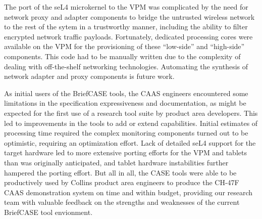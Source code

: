 
The port of the seL4 microkernel to the VPM was complicated by the need for network
proxy and adapter components to bridge the untrusted wireless network to the rest of the sytem in a trustworthy
manner, including the ability to filter encrypted network traffic payloads. Fortunately, dedicated
processing cores were available on the VPM for the provisioning of these ``low-side'' and ``high-side''
components. This code had to be manually written due to the complexity of dealing with
off-the-shelf networking technologies.  Automating the synthesis of network adapter and proxy components
is future work.

As initial users of the BriefCASE tools, the CAAS engineers encountered some limitations in the
specification expressiveness and documentation, as might be
expected for the first use of a research tool suite by product area developers. 
This led to improvements in the tools to add or extend capabilities.  Initial estimates of
processing time required the complex monitoring components turned out to be optimistic,
requiring an optimization effort. Lack of detailed seL4 support for the target hardware led to more
extensive porting efforts for the VPM and tablets than was originally anticipated, and tablet
hardware instabilities further hampered the porting effort. But all in all, the CASE tools were able
to be productively used by Collins product area engineers to produce the CH-47F CAAS demonstration
system on time and within budget, providing our research team with valuable feedback on the
strengths and weaknesses of the current BriefCASE tool envionment.
